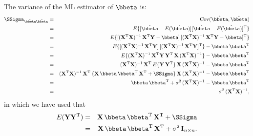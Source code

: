 \documentclass[a4paper]{article}
\theoremstyle{myexamplestyle}
\begin{document}
The variance of the ML estimator of $\bbeta$ is:
\begin{eqnarray*}
\SSigma_{\hat{\bbeta} \hat{\bbeta}} & = &  \mbox{Cov}(\hat{\bbeta}, \hat{\bbeta})
\\
& = & E\{ [\hat{\bbeta} - E(\hat{\bbeta})] [\hat{\bbeta} - E(\hat{\bbeta})]^{\mathrm{T}} \}
\\
& = & E\{ [(\mathbf{X}^{\mathrm{T}} \mathbf{X})^{-1} \, \mathbf{X}^{\mathrm{T}} \mathbf{Y} - \bbeta] \, [(\mathbf{X}^{\mathrm{T}} \mathbf{X})^{-1} \, \mathbf{X}^{\mathrm{T}} \mathbf{Y} - \bbeta]^{\mathrm{T}} \}
\\
& = & E\{ [(\mathbf{X}^{\mathrm{T}} \mathbf{X})^{-1} \, \mathbf{X}^{\mathrm{T}} \mathbf{Y}] \, [(\mathbf{X}^{\mathrm{T}} \mathbf{X})^{-1} \, \mathbf{X}^{\mathrm{T}} \mathbf{Y}]^{\mathrm{T}} \} - \bbeta \, \bbeta^{\mathrm{T}}
\\
& = & E\{ (\mathbf{X}^{\mathrm{T}} \mathbf{X})^{-1} \, \mathbf{X}^{\mathrm{T}} \mathbf{Y} \, \mathbf{Y}^{\mathrm{T}} \, \mathbf{X} \, (\mathbf{X}^{\mathrm{T}} \mathbf{X})^{-1}  \} - \bbeta \, \bbeta^{\mathrm{T}}
\\
& = & (\mathbf{X}^{\mathrm{T}} \mathbf{X})^{-1} \, \mathbf{X}^{\mathrm{T}} \, E \{ \mathbf{Y} \, \mathbf{Y}^{\mathrm{T}} \} \, \mathbf{X} \, (\mathbf{X}^{\mathrm{T}} \mathbf{X})^{-1} - \bbeta \, \bbeta^{\mathrm{T}}
\\
& = & (\mathbf{X}^{\mathrm{T}} \mathbf{X})^{-1} \, \mathbf{X}^{\mathrm{T}} \, \{ \mathbf{X} \, \bbeta \, \bbeta^{\mathrm{T}} \,  \mathbf{X}^{\mathrm{T}} + \SSigma \} \, \mathbf{X} \, (\mathbf{X}^{\mathrm{T}} \mathbf{X})^{-1} - \bbeta \, \bbeta^{\mathrm{T}}
\\
& = & \bbeta \, \bbeta^{\mathrm{T}}  + \sigma^2 \, (\mathbf{X}^{\mathrm{T}} \mathbf{X})^{-1} - \bbeta \, \bbeta^{\mathrm{T}}
\\
& = & \sigma^2 \, (\mathbf{X}^T \mathbf{X})^{-1},
\end{eqnarray*}
in which we have used that
\begin{eqnarray*}
E(\mathbf{Y} \mathbf{Y}^{\mathrm{T}}) & = &  \mathbf{X} \, \bbeta \, \bbeta^{\mathrm{T}} \,  \mathbf{X}^{\mathrm{T}} + \SSigma
\\
& = &  \mathbf{X} \, \bbeta \, \bbeta^{\mathrm{T}} \,  \mathbf{X}^{\mathrm{T}} + \sigma^2 \, \mathbf{I}_{n \times n}.
\end{eqnarray*}
\end{document}
